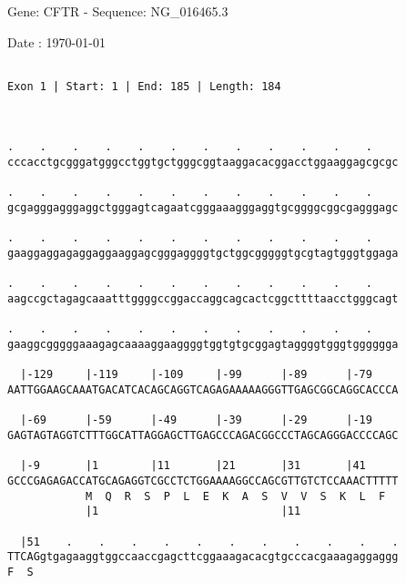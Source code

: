 \documentclass{article}
\begin{document}
\begin{center}
\begin{large}
 Gene: CFTR - Sequence: NG\_016465.3
 
 Date : \today
\end{large}
\end{center}
 \begin{Verbatim}
 
Exon 1 | Start: 1 | End: 185 | Length: 184



.    .    .    .    .    .    .    .    .    .    .    .    
cccacctgcgggatgggcctggtgctgggcggtaaggacacggacctggaaggagcgcgc
                                                            
.    .    .    .    .    .    .    .    .    .    .    .    
gcgagggagggaggctgggagtcagaatcgggaaagggaggtgcggggcggcgagggagc
                                                            
.    .    .    .    .    .    .    .    .    .    .    .    
gaaggaggagaggaggaaggagcgggaggggtgctggcgggggtgcgtagtgggtggaga
                                                            
.    .    .    .    .    .    .    .    .    .    .    .    
aagccgctagagcaaatttggggccggaccaggcagcactcggcttttaacctgggcagt
                                                            
.    .    .    .    .    .    .    .    .    .    .    .    
gaaggcgggggaaagagcaaaaggaaggggtggtgtgcggagtaggggtgggtgggggga
                                                            
  |-129     |-119     |-109     |-99      |-89      |-79    
AATTGGAAGCAAATGACATCACAGCAGGTCAGAGAAAAAGGGTTGAGCGGCAGGCACCCA
                                                            
  |-69      |-59      |-49      |-39      |-29      |-19    
GAGTAGTAGGTCTTTGGCATTAGGAGCTTGAGCCCAGACGGCCCTAGCAGGGACCCCAGC
                                                            
  |-9       |1        |11       |21       |31       |41     
GCCCGAGAGACCATGCAGAGGTCGCCTCTGGAAAAGGCCAGCGTTGTCTCCAAACTTTTT
            M  Q  R  S  P  L  E  K  A  S  V  V  S  K  L  F  
            |1                            |11               
  
  |51    .    .    .    .    .    .    .    .    .    .    .
TTCAGgtgagaaggtggccaaccgagcttcggaaagacacgtgcccacgaaagaggaggg
F  S                                                        
                                                            

\end{Verbatim}
\end{document}
